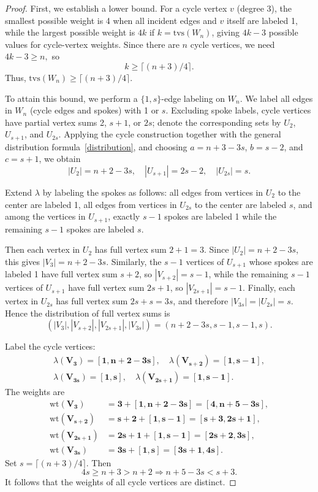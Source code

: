 \documentclass[11pt]{article}
\numberwithin{equation}{section}
\newcommand{\wt}{\mathrm{wt}}
\newcommand{\bv}[1]{\mathbf{#1}}
\begin{document}
\begin{proof}
First, we establish a lower bound. For a cycle vertex \(v\) (degree 3), the smallest possible weight is 4 when all incident edges and \(v\) itself are labeled 1, while the largest possible weight is \(4k\) if \(k=\mathrm{tvs}(W_n)\), giving \(4k-3\) possible values for cycle-vertex weights. Since there are \(n\) cycle vertices, we need
\(
4k - 3 \geq n,
\)
so
\[
k \geq \lceil (n + 3) / 4 \rceil.
\]
Thus, \(\mathrm{tvs}(W_n) \geq \lceil (n + 3) / 4 \rceil\).

To attain this bound, we perform a \(\{1,s\}\)-edge labeling on \(W_n\). We label all edges in \(W_n\) (cycle edges and spokes) with 1 or \(s\). Excluding spoke labels, cycle vertices have partial vertex sums 2, \(s + 1\), or \(2s\); denote the corresponding sets by \(U_2\), \(U_{s+1}\), and \(U_{2s}\). Applying the cycle construction together with the general distribution formula~\eqref{distribution}, and choosing \(a=n+3-3s\), \(b=s-2\), and \(c=s+1\), we obtain
\[
|U_2| = n + 2 - 3s, \quad |U_{s+1}| = 2s - 2, \quad |U_{2s}| = s.
\]

Extend \(\lambda\) by labeling the spokes as follows: all edges from vertices in \(U_2\) to the center are labeled 1, all edges from vertices in \(U_{2s}\) to the center are labeled \(s\), and among the vertices in \(U_{s+1}\), exactly \(s-1\) spokes are labeled 1 while the remaining \(s-1\) spokes are labeled \(s\).

Then each vertex in \(U_2\) has full vertex sum \(2+1=3\). Since \(|U_2|=n+2-3s\), this gives \(|V_3|=n+2-3s\). Similarly, the \(s-1\) vertices of \(U_{s+1}\) whose spokes are labeled 1 have full vertex sum \(s+2\), so \(|V_{s+2}|=s-1\), while the remaining \(s-1\) vertices of \(U_{s+1}\) have full vertex sum \(2s+1\), so \(|V_{2s+1}|=s-1\). Finally, each vertex in \(U_{2s}\) has full vertex sum \(2s+s=3s\), and therefore \(|V_{3s}|=|U_{2s}|=s\). Hence the distribution of full vertex sums is
\[
(|V_3|, |V_{s+2}|, |V_{2s+1}|, |V_{3s}|) = (n + 2 - 3s, s - 1, s - 1, s).
\]

Label the cycle vertices:
\begin{gather*}
\lambda(\bv{V_3}) = \bv{[1,n+2-3s]}, \quad \lambda(\bv{V_{s+2}}) = \bv{[1,s-1]}, \\ \lambda(\bv{V_{3s}}) = \bv{[1,s]}, \quad \lambda(\bv{V_{2s+1}}) = \bv{[1,s-1]}.
\end{gather*}
The weights are
\begin{align*}
\wt(\bv{V_3}) &= \bv{3} + \bv{[1,n+2-3s]} = \bv{[4,n+5-3s]}, \\
\wt(\bv{V_{s+2}}) &= \bv{s+2} + \bv{[1,s-1]} = \bv{[s+3,2s+1]}, \\
\wt(\bv{V_{2s+1}}) &= \bv{2s+1} + \bv{[1,s-1]} = \bv{[2s+2,3s]}, \\
\wt(\bv{V_{3s}}) &= \bv{3s} + \bv{[1,s]} = \bv{[3s+1,4s]}.
\end{align*}
Set \(s = \lceil (n + 3) / 4 \rceil\). Then
\[
4s \geq n + 3 > n + 2 \Rightarrow n + 5 - 3s < s + 3.
\]
It follows that the weights of all cycle vertices are distinct.


\end{proof}
\end{document}
